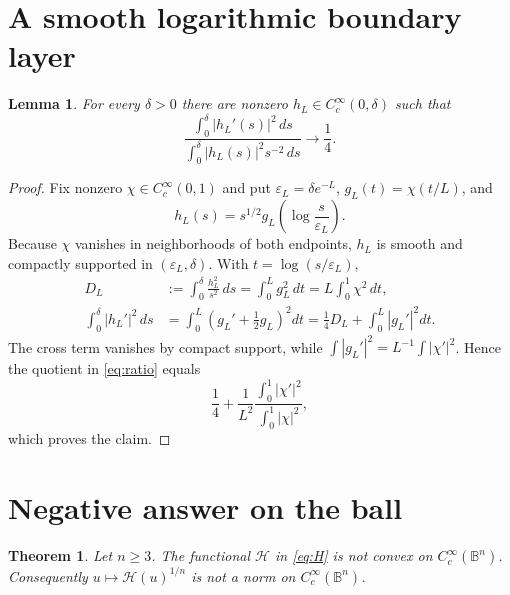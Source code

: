 \documentclass[11pt]{article}
\newtheorem{theorem}{Theorem}
\newtheorem{lemma}{Lemma}
\newcommand{\B}{\mathbb B}
\newcommand{\Cc}{C_c^\infty}
\newcommand{\HH}{\mathcal H}
\begin{document}
\section{A smooth logarithmic boundary layer}

\begin{lemma}\label{lem:layer}
For every $\delta>0$ there are nonzero $h_L\in\Cc(0,\delta)$ such that
\begin{equation}\label{eq:ratio}
 \frac{\int_0^\delta |h_L'(s)|^2\,ds}
 {\int_0^\delta |h_L(s)|^2s^{-2}\,ds}\longrightarrow\frac14.
\end{equation}
\end{lemma}

\begin{proof}
Fix nonzero $\chi\in\Cc(0,1)$ and put $\varepsilon_L=\delta e^{-L}$,
$g_L(t)=\chi(t/L)$, and
\[
 h_L(s)=s^{1/2}g_L\!\left(\log\frac{s}{\varepsilon_L}\right).
\]
Because $\chi$ vanishes in neighborhoods of both endpoints, $h_L$ is smooth
and compactly supported in $(\varepsilon_L,\delta)$.  With
$t=\log(s/\varepsilon_L)$,
\begin{align*}
 D_L&:=\int_0^\delta\frac{h_L^2}{s^2}\,ds
     =\int_0^L g_L^2\,dt=L\int_0^1\chi^2\,dt,\\
 \int_0^\delta |h_L'|^2\,ds
     &=\int_0^L\left(g_L'+\tfrac12g_L\right)^2dt
       =\tfrac14D_L+\int_0^L|g_L'|^2dt.
\end{align*}
The cross term vanishes by compact support, while
$\int|g_L'|^2=L^{-1}\int|\chi'|^2$.  Hence the quotient in
\eqref{eq:ratio} equals
\[
 \frac14+\frac1{L^2}
 \frac{\int_0^1|\chi'|^2}{\int_0^1|\chi|^2},
\]
which proves the claim.
\end{proof}

\section{Negative answer on the ball}

\begin{theorem}\label{thm:ball}
Let $n\ge3$.  The functional $\HH$ in \eqref{eq:H} is not convex on
$\Cc(\B^n)$.  Consequently $u\mapsto\HH(u)^{1/n}$ is not a norm on
$\Cc(\B^n)$.
\end{theorem}
\end{document}
